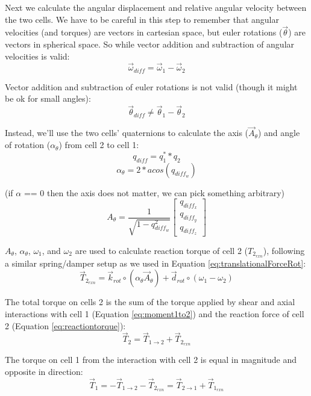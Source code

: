{Next we calculate the angular displacement and relative angular velocity between the two cells.  We have to be careful in this step to remember that angular velocities (and torques) are vectors in cartesian space, but euler rotations ($\vec{\theta}$) are vectors in spherical space.  So while vector addition and subtraction of angular velocities is valid:
\[ \vec{\omega}_{diff} = \vec{\omega}_1 - \vec{\omega}_2 \]

Vector addition and subtraction of euler rotations is not valid (though it might be ok for small angles):
\[ \vec{\theta}_{diff} \neq \vec{\theta}_1 - \vec{\theta}_2 \]

Instead, we'll use the two cells' quaternions to calculate the axis ($\vec{A}_{\theta}$) and angle of rotation ($\alpha_{\theta}$) from cell 2 to cell 1:
\begin{equation}\label{eq:qdiff}
q_{diff} = q_1^{*}*q_2 
\end{equation}
\[ \alpha_{\theta} = 2*acos(q_{diff_w}) \]

(if $\alpha$ == 0 then the axis does not matter, we can pick something arbitrary)
\[ A_{\theta} = \dfrac{1}{\sqrt{1-q_{diff_w}^2}} \left[ \begin{array}{ccc}
q_{diff_x}\\
q_{diff_y}\\
q_{diff_z}
 \end{array} \right] \]
 
$A_{\theta}$,  $\alpha_{\theta}$, $\omega_1$, and $\omega_2$ are used to calculate reaction torque of cell 2 ($T_{2_{rxn}}$), following a similar spring/damper setup as we used in Equation \ref{eq:translationalForceRot}:
\begin{equation}\label{eq:reactiontorque}
\vec{T}_{2_{rxn}} = \vec{k}_{rot} \circ (\alpha_{\theta} \vec{A}_{\theta}) + \vec{d}_{rot} \circ (\omega_1-\omega_2)
\end{equation}

The total torque on cells 2 is the sum of the torque applied by shear and axial interactions with cell 1 (Equation \ref{eq:moment1to2}) and the reaction force of cell 2 (Equation \ref{eq:reactiontorque}):
\begin{equation}\label{eq:torqueEquation}
\vec{T}_2 = \vec{T}_{1\rightarrow2} + \vec{T}_{2_{rxn}}
\end{equation}

The torque on cell 1 from the interaction with cell 2 is equal in magnitude and opposite in direction:
\[ \vec{T}_1 = -\vec{T}_{1\rightarrow2} - \vec{T}_{2_{rxn}}  = \vec{T}_{2\rightarrow1} + \vec{T}_{1_{rxn}}\]

}
